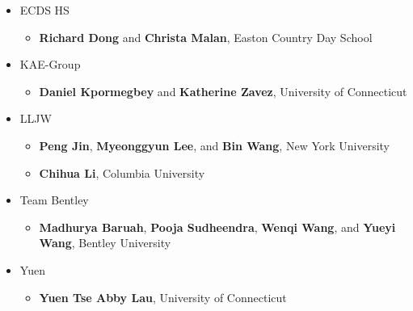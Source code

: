 
\begin{itemize}
\item ECDS HS
  \begin{itemize}
  \item \textbf{Richard Dong} and \textbf{Christa Malan}, Easton Country Day School
  \end{itemize}
\item KAE-Group
  \begin{itemize}
  \item \textbf{Daniel Kpormegbey} and \textbf{Katherine Zavez}, University of Connecticut
  \end{itemize}
\item LLJW
  \begin{itemize}
  \item \textbf{Peng Jin}, \textbf{Myeonggyun Lee}, and \textbf{Bin Wang}, New York University
  \item \textbf{Chihua Li}, Columbia University
  \end{itemize}
\item Team Bentley
  \begin{itemize}
  \item \textbf{Madhurya Baruah},
    \textbf{Pooja Sudheendra},
    \textbf{Wenqi Wang}, and
    \textbf{Yueyi Wang}, Bentley University
  \end{itemize}
\item Yuen
  \begin{itemize}
  \item \textbf{Yuen Tse Abby Lau}, University of Connecticut
  \end{itemize}
\end{itemize}




